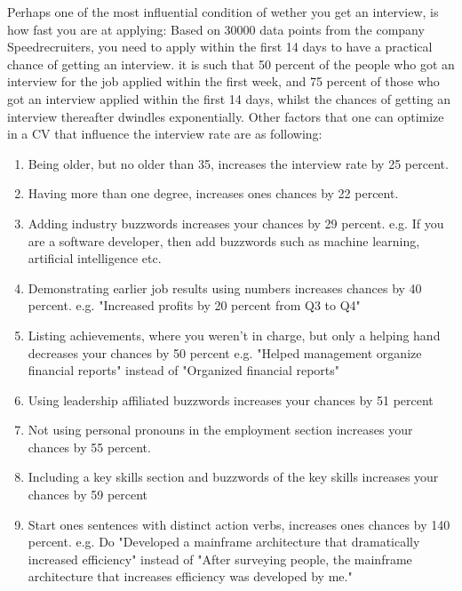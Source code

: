 Perhaps one of the most influential condition of wether you get an interview,
is how fast you are at applying:
Based on 30000 data points from the company Speedrecruiters, you need
to apply within the first 14 days to have a practical chance of getting an
interview. it is such that 50 percent of the people who got an interview
for the job applied within the first week, and 75 percent of those who
got an interview applied within the first 14 days, whilst the chances of
getting an interview thereafter dwindles exponentially.\cite{Best_time_and_dateV2}
Other factors that one can optimize in a CV that influence the interview rate are as following:
\begin{enumerate}
\item Being older, but no older than 35, increases the interview rate by 25 percent.
\item Having more than one degree, increases ones chances by 22 percent.
\item Adding industry buzzwords increases your chances by 29 percent.
   e.g. If you are a software developer, then add buzzwords such as machine learning,
   artificial intelligence etc.
\item Demonstrating earlier job results using numbers increases chances by 40 percent.
   e.g. "Increased profits by 20 percent from Q3 to Q4"
\item Listing achievements, where you weren't in charge, but only a helping hand
 decreases your chances by 50 percent
   e.g. "Helped management organize financial reports" instead of "Organized financial reports"
\item Using leadership affiliated buzzwords increases your chances by 51 percent
\item Not using personal pronouns in the employment section increases your
chances by 55 percent.
\item Including a key skills section and buzzwords of the key skills increases your
 chances by 59 percent
\item Start ones sentences with distinct action verbs, increases ones chances by 140 percent.
   e.g. Do "Developed a mainframe architecture that dramatically increased efficiency"
   instead of "After surveying people, the mainframe architecture that increases efficiency was
   developed by me."\cite{Science_job}
\end{enumerate}
